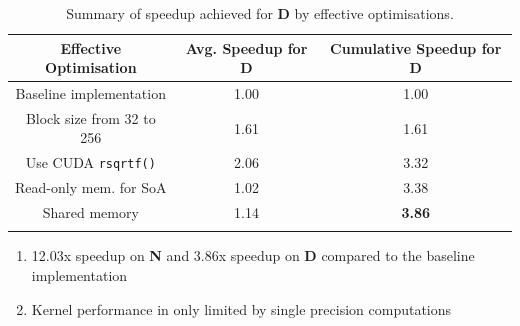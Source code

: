 \documentclass[12pt, a4paper]{article}
\begin{document}
\renewcommand{\arraystretch}{1.3}
\begin{longtable}{|c|c|c|}
  \hline \endfirsthead \rowcolor{lightgray}
  Effective Optimisation & Avg. Speedup for \textbf{D} & Cumulative Speedup for \textbf{D} \\ \hline
  Baseline implementation    & 1.00 & 1.00 \\
  Block size from 32 to 256  & 1.61 & 1.61 \\
  Use CUDA \texttt{rsqrtf()} & 2.06 & 3.32 \\
  Read-only mem. for SoA     & 1.02 & 3.38 \\
  Shared memory              & 1.14 & \textbf{3.86} \\ \hline
  \caption{Summary of speedup achieved for \textbf{D} by effective optimisations.}
\end{longtable}
\renewcommand{\arraystretch}{1}

\begin{enumerate}
  \item 12.03x speedup on \textbf{N} and 3.86x speedup on \textbf{D} compared to the baseline
  implementation

  \item Kernel performance in only limited by single precision computations
\end{enumerate}


\printbibliography[heading=bibintoc]
\end{document}
